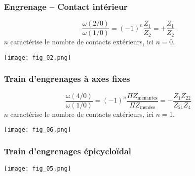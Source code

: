 \subsubsection{Engrenage -- Contact intérieur}
\begin{table*}[!h]
\begin{minipage}[c]{.4\linewidth}
\begin{resultat}
$$
\dfrac{\omega(2/0)}{\omega(1/0)}= (-1)^n \dfrac{Z_1}{Z_2}=+\dfrac{Z_1}{Z_2}
$$
$n$ caractérise le nombre de contacts extérieurs, ici $n=0$.
\end{resultat}
\end{minipage}\hfill
\begin{minipage}[c]{.6\linewidth}
\begin{center}
\texttt{[image: fig\_02.png]}
\end{center}
\end{minipage}
\end{table*}

\subsubsection{Train d'engrenages à axes fixes}


\begin{resultat}
$$
\dfrac{\omega(4/0)}{\omega(1/0)}= (-1)^n \dfrac{\Pi Z_{\text{menantes}}}{\Pi Z_{\text{menées}}}=-\dfrac{Z_1Z_{22}}{Z_{21}Z_4}
$$
$n$ caractérise le nombre de contacts extérieurs, ici $n=1$.
\end{resultat}


\begin{marginfigure}[-4cm]
\texttt{[image: fig\_06.png]}
\end{marginfigure}



\subsubsection{Train d'engrenages épicycloïdal}
\begin{marginfigure}
\texttt{[image: fig\_05.png]}
\end{marginfigure}

